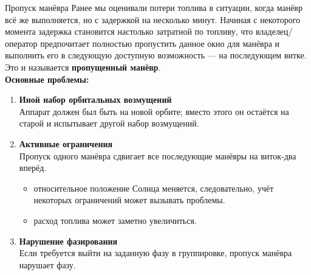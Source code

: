 \documentclass[8pt]{beamer}
\begin{document}
\begin{frame}{Пропуск манёвра}
Ранее мы оценивали потери топлива в ситуации, когда манёвр всё же выполняется, но с задержкой на несколько минут. Начиная с некоторого момента задержка становится настолько затратной по топливу, что владелец/оператор предпочитает полностью пропустить данное окно для манёвра и выполнить его в следующую доступную возможность — на последующем витке. Это и называется \textbf{пропущенный манёвр}. \\
\smallskip
\textbf{Основные проблемы:}
\begin{enumerate}
    \item \textbf{Иной набор орбитальных возмущений} \\
    Аппарат должен был быть на новой орбите; вместо этого он остаётся на старой и испытывает другой набор возмущений.

    \item \textbf{Активные ограничения} \\
    Пропуск одного манёвра сдвигает все последующие манёвры на виток-два вперёд.
    \begin{itemize}
        \item относительное положение Солнца меняется, следовательно, учёт некоторых ограничений может вызывать проблемы.
        \item расход топлива может заметно увеличиться.
    \end{itemize}

    \item \textbf{Нарушение фазирования} \\
    Если требуется выйти на заданную фазу в группировке, пропуск манёвра нарушает фазу.
\end{enumerate}
\end{frame}
\end{document}
